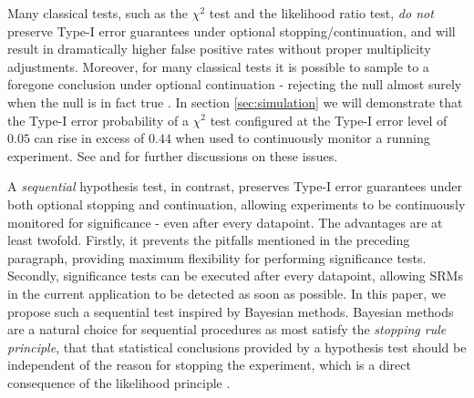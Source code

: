 \documentclass[11pt]{article}
\begin{document}
Many classical tests, such as the $\chi^2$ test and the likelihood ratio test, \textit{do not} preserve Type-I error guarantees under optional stopping/continuation,
and will result in dramatically higher false positive rates without proper multiplicity adjustments.
Moreover, for many classical tests it is possible to sample to a foregone conclusion under optional continuation - rejecting the null almost surely when the null is in fact true \cite{anscombe}.
In section \ref{sec:simulation} we will demonstrate that the Type-I error probability of a $\chi^2$ test configured at the Type-I error level of $0.05$ can rise in excess of $0.44$ when used to continuously monitor a running experiment.
See \cite{psychological} and \cite{safe} for further discussions on these issues.

A \textit{sequential} hypothesis test, in contrast, preserves Type-I error guarantees under both optional stopping and continuation, allowing experiments to be continuously monitored for significance - even after every datapoint.
The advantages are at least twofold. Firstly, it prevents the pitfalls mentioned in the preceding paragraph, providing maximum flexibility for performing significance tests.
Secondly, significance tests can be executed after every datapoint, allowing SRMs in the current application to be detected as soon as possible.
In this paper, we propose such a sequential test inspired by Bayesian methods.
Bayesian methods are a natural choice for sequential procedures as most satisfy the \textit{stopping rule principle}, that that statistical conclusions provided by a hypothesis test should be independent of the reason for stopping the experiment, which is a direct consequence of the likelihood principle \citep{likelihood}.
\end{document}
